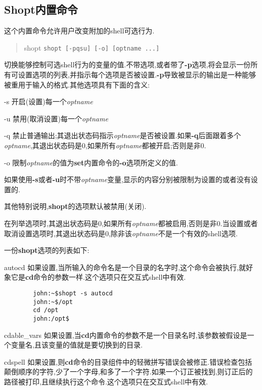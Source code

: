\documentclass[draft,openany]{book}
\begin{document}
\begin{CJK}{UTF8}{gbsn}
    \subsection{Shopt内置命令}
    这个内置命令允许用户改变附加的shell可选行为.
    \begin{quote}
        shopt
                \verb+shopt [-pqsu] [-o] [optname ...]+
    \end{quote}
    切换能够控制可选shell行为的变量的值.不带选项,或者带了\textbf{-p}选项,将会显示一份所有可设置选项的列表,并指示每个选项是否被设置.\textbf{-p}导致被显示的输出是一种能够被重用于输入的格式.其他选项具有下面的含义:
    \begin{basedescript}{\desclabelstyle{\nextlinelabel}\desclabelwidth{2.5em}}
    \item[-s] 开启(设置)每一个\emph{optname}
    \item[-u] 禁用(取消设置)每一个\emph{optname}
    \item[-q] 禁止普通输出;其退出状态码指示\emph{optname}是否被设置.如果\textbf{-q}后面跟着多个\emph{optname},其退出状态码是0,如果所有\emph{optname}都被开启;否则是非0.
    \item[-o] 限制\emph{optname}的值为\textbf{set}内置命令的\textbf{-o}选项所定义的值.
    \end{basedescript}
    如果使用\textbf{-s}或者\textbf{-u}时不带\emph{optname}变量,显示的内容分别被限制为设置的或者没有设置的.\par
    其他特别说明,\textbf{shopt}的选项默认被禁用(关闭).\par
    在列举选项时,其退出状态码是0,如果所有\emph{optname}都被启用,否则是非0.当设置或者取消设置选项时,其退出状态码是0,除非该\emph{optname}不是一个有效的shell选项.\par
    一份\textbf{shopt}选项的列表如下:
    \begin{basedescript}{\desclabelstyle{\nextlinelabel}\desclabelwidth{2.5em}}
    \item[autocd] 如果设置,当所输入的命令名是一个目录的名字时,这个命令会被执行,就好象它是\textbf{cd}命令的参数一样.这个选项只在交互式shell中有效.
        \begin{verbatim}
        john:~$shopt -s autocd
        john:~$/opt
        cd /opt
        john:/opt$
        \end{verbatim}
    \item[cdable\_vars] 如果设置,当\textbf{cd}内置命令的参数不是一个目录名时,该参数被假设是一个变量名,且该变量的值就是要切换到的目录.
    \item[cdspell] 如果设置,则\textbf{cd}命令的目录组件中的轻微拼写错误会被修正.错误检查包括颠倒顺序的字符,少了一个字母,和多了一个字符.如果一个订正被找到,则订正后的路径被打印,且继续执行这个命令.这个选项只在交互式shell中有效.

\end{basedescript}
\end{CJK}
\end{document}
